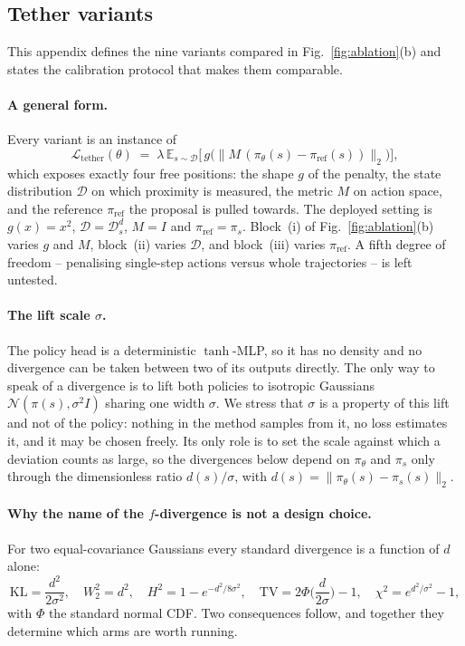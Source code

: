 \subsection{Tether variants}
\label{app:tether}

This appendix defines the nine variants compared in
Fig.~\ref{fig:ablation}(b) and states the calibration protocol that makes them
comparable.

\paragraph{A general form.}
Every variant is an instance of
\begin{equation}
\mathcal{L}_{\mathrm{tether}}(\theta) \;=\; \lambda\,
\mathbb{E}_{s\sim\mathcal{D}}\Big[\,
g\big(\lVert M\,(\pi_\theta(s)-\pi_{\mathrm{ref}}(s))\rVert_2\big)\Big],
\label{eq:tether-general}
\end{equation}
which exposes exactly four free positions: the shape $g$ of the penalty, the
state distribution $\mathcal{D}$ on which proximity is measured, the metric $M$
on action space, and the reference $\pi_{\mathrm{ref}}$ the proposal is pulled
towards. The deployed setting is $g(x)=x^2$, $\mathcal{D}=\mathcal{D}^d_s$,
$M=I$ and $\pi_{\mathrm{ref}}=\pi_s$. Block~(i) of
Fig.~\ref{fig:ablation}(b) varies $g$ and $M$, block~(ii) varies $\mathcal{D}$,
and block~(iii) varies $\pi_{\mathrm{ref}}$. A fifth degree of freedom --
penalising single-step actions versus whole trajectories -- is left untested.

\paragraph{The lift scale $\sigma$.}
The policy head is a deterministic $\tanh$-MLP, so it has no density and no
divergence can be taken between two of its outputs directly. The only way to
speak of a divergence is to lift both policies to isotropic Gaussians
$\mathcal{N}(\pi(s),\sigma^2 I)$ sharing one width $\sigma$. We stress that
$\sigma$ is a property of this lift and not of the policy: nothing in the method
samples from it, no loss estimates it, and it may be chosen freely. Its only
role is to set the scale against which a deviation counts as large, so the
divergences below depend on $\pi_\theta$ and $\pi_s$ only through the
dimensionless ratio $d(s)/\sigma$, with
$d(s) = \lVert\pi_\theta(s)-\pi_s(s)\rVert_2$.

\paragraph{Why the name of the $f$-divergence is not a design choice.}
For two equal-covariance Gaussians every standard divergence is a function of
$d$ alone:
\begin{equation}
\mathrm{KL} = \frac{d^2}{2\sigma^2},\quad
W_2^2 = d^2,\quad
H^2 = 1-e^{-d^2/8\sigma^2},\quad
\mathrm{TV} = 2\Phi\!\Big(\frac{d}{2\sigma}\Big)-1,\quad
\chi^2 = e^{d^2/\sigma^2}-1 ,
\label{eq:divergences}
\end{equation}
with $\Phi$ the standard normal CDF. Two consequences follow, and together they
determine which arms are worth running.

